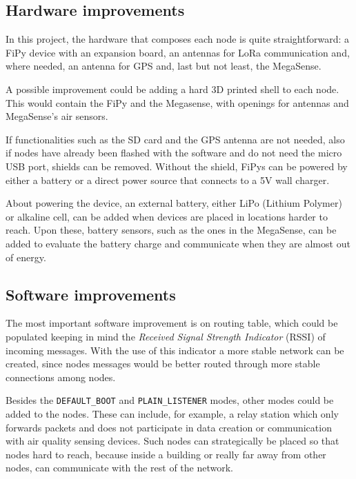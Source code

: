 		\subsection{Hardware improvements}
		
			In this project, the hardware that composes each node is quite straightforward: a FiPy device with an expansion board, an antennas for LoRa communication and, where needed, an antenna for GPS and, last but not least, the MegaSense.
			
			A possible improvement could be adding a hard 3D printed shell to each node.
			This would contain the FiPy and the Megasense, with openings for antennas and MegaSense's air sensors.
			
			If functionalities such as the SD card and the GPS antenna are not needed, also if nodes have already been flashed with the software and do not need the micro USB port, shields can be removed.
			Without the shield, FiPys can be powered by either a battery or a direct power source that connects to a 5V wall charger.
			
			About powering the device, an external battery, either LiPo (Lithium Polymer) or alkaline cell, can be added when devices are placed in locations harder to reach.
			Upon these, battery sensors, such as the ones in the MegaSense, can be added to evaluate the battery charge and communicate when they are almost out of energy.

		\subsection{Software improvements}\label{sec:software_improvements}
		
			The most important software improvement is on routing table, which could be populated keeping in mind the \textit{Received Signal Strength Indicator} (RSSI) of incoming messages.
			With the use of this indicator a more stable network can be created, since nodes messages would be better routed through more stable connections among nodes.

			Besides the \texttt{DEFAULT\_BOOT} and \texttt{PLAIN\_LISTENER} modes, other modes could be added to the nodes.
			These can include, for example, a relay station which only forwards packets and does not participate in data creation or communication with air quality sensing devices.
			Such nodes can strategically be placed so that nodes hard to reach, because inside a building or really far away from other nodes, can communicate with the rest of the network.

